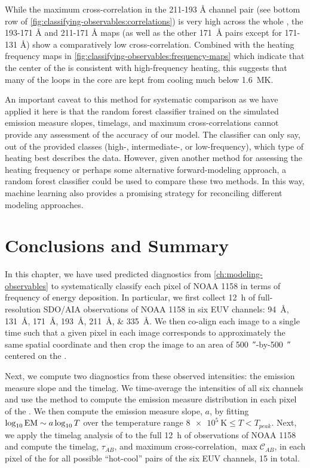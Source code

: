 While the maximum cross-correlation in the 211-193 \si{\angstrom} channel pair (see bottom row of \autoref{fig:classifying-observables:correlations}) is very high across the whole \AR{}, the 193-171 \si{\angstrom} and 211-171 \si{\angstrom} maps (as well as the other \SI{171}{\angstrom} pairs except for 171-131 \si{\angstrom}) show a comparatively low cross-correlation. Combined with the heating frequency maps in \autoref{fig:classifying-observables:frequency-maps} which indicate that the center of the \AR{} is consistent with high-frequency heating, this suggests that many of the loops in the core are kept from cooling much below \SI{1.6}{\mega\kelvin}.

An important caveat to this method for systematic comparison as we have applied it here is that the random forest classifier trained on the simulated emission measure slopes, timelags, and maximum cross-correlations cannot provide any assessment of the accuracy of our model. The classifier can only say, out of the provided classes (high-, intermediate-, or low-frequency), which type of heating best describes the data. However, given another method for assessing the heating frequency or perhaps some alternative forward-modeling approach, a random forest classifier could be used to compare these two methods. In this way, machine learning also provides a promising strategy for reconciling different modeling approaches.

\section{Conclusions and Summary}\label{sec:classifying-observables:conclusions}

In this chapter, we have used predicted diagnostics from \autoref{ch:modeling-observables} to systematically classify each pixel of \AR{} NOAA 1158 in terms of frequency of energy deposition. In particular, we first collect \SI{12}{\hour} of full-resolution SDO/AIA observations of NOAA 1158 in six EUV channels: \SIlist{94;131;171;193;211;335}{\angstrom}. We then co-align each image to a single time such that a given pixel in each image corresponds to approximately the same spatial coordinate and then crop the image to an area of \SI{500}{\arcsecond}-by-\SI{500}{\arcsecond} centered on the \AR{}.

Next, we compute two diagnostics from these observed intensities: the emission measure slope and the timelag. We time-average the intensities of all six channels and use the method \citet{hannah_differential_2012} to compute the emission measure distribution in each pixel of the \AR{}. We then compute the emission measure slope, $a$, by fitting $\log_{10}\textup{EM}\sim a\log_{10}T$ over the temperature range $\SI{8e5}{\kelvin}\le T < T_{peak}$. Next, we apply the timelag analysis of \citet{viall_evidence_2012} to the full \SI{12}{\hour} of observations of NOAA 1158 and compute the timelag, $\tau_{AB}$, and maximum cross-correlation, $\max\mathcal{C}_{AB}$, in each pixel of the \AR{} for all possible ``hot-cool'' pairs of the six EUV channels, 15 in total.

